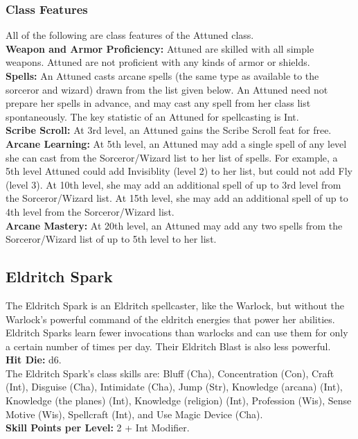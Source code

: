 \documentclass[11pt]{report}
\begin{document}
\subsubsection{Class Features}
All of the following are class features of the Attuned class. \\
\textbf{Weapon and Armor Proficiency:} Attuned are skilled with all simple
weapons. Attuned are not proficient with any kinds of armor or shields. \\
\textbf{Spells:} An Attuned casts arcane spells (the same type as available to
the sorceror and wizard) drawn from the list given below. An Attuned need not
prepare her spells in advance, and may cast any spell from her class list
spontaneously. The key statistic of an Attuned for spellcasting is Int. \\
\textbf{Scribe Scroll:} At 3rd level, an Attuned gains the Scribe Scroll feat
for free. \\
\textbf{Arcane Learning:} At 5th level, an Attuned may add a single spell of any
level she can cast from the Sorceror/Wizard list to her list of spells. For
example, a 5th level Attuned could add Invisiblity (level 2) to her list, but could not
add Fly (level 3). At 10th level, she may add an additional spell of up to 3rd
level from the Sorceror/Wizard list. At 15th level, she may add an additional
spell of up to 4th level from the Sorceror/Wizard list. \\
\textbf{Arcane Mastery:} At 20th level, an Attuned may add any two spells from
the Sorceror/Wizard list of up to 5th level to her list.

\subsection{Eldritch Spark}
The Eldritch Spark is an Eldritch spellcaster, like the Warlock, but without the
Warlock's powerful command of the eldritch energies that power her abilities. \\

Eldritch Sparks learn fewer invocations than warlocks and can use them for only
a certain number of times per day. Their Eldritch Blast is also less powerful.
\\
\textbf{Hit Die:} d6. \\
The Eldritch Spark's class skills are: Bluff (Cha), Concentration (Con), Craft
(Int), Disguise (Cha), Intimidate (Cha), Jump (Str), Knowledge (arcana) (Int),
Knowledge (the planes) (Int), Knowledge (religion) (Int), Profession (Wis),
Sense Motive (Wis), Spellcraft (Int), and Use Magic Device (Cha). \\
\textbf{Skill Points per Level:} 2 + Int Modifier.
\end{document}
